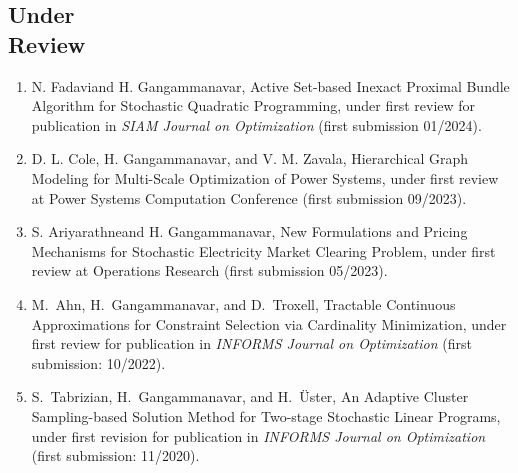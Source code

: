 \documentclass[hyperref, margin]{myResume}
\newif\ifpublic
\begin{document}
\begin{resume}
\section{Under\\Review}
\begin{enumerate}[label=R\arabic*., leftmargin=*] 
	\item N. Fadavi\footnotemark[1] and H. Gangammanavar, Active Set-based Inexact Proximal Bundle Algorithm for Stochastic Quadratic Programming, \ifpublic 2024 (first review). \else under first review for publication in \textit{SIAM Journal on Optimization} (first submission 01/2024)\fi.
	\item D. L. Cole, H. Gangammanavar, and V. M. Zavala, Hierarchical Graph Modeling for Multi-Scale Optimization of Power Systems, \ifpublic 2023 (first review). \else under first review at Power Systems Computation Conference (first submission 09/2023).\fi
	\item S. Ariyarathne\footnotemark[1] and H. Gangammanavar, New Formulations and Pricing Mechanisms for Stochastic Electricity Market Clearing Problem, \ifpublic 2023 (first revision). \else under first review at Operations Research (first submission 05/2023).\fi
	\item M.\ Ahn, H.\ Gangammanavar, and D.\ Troxell\footnotemark[3], Tractable Continuous Approximations for Constraint Selection via Cardinality Minimization, \ifpublic 2022 (first review). \else under first review for publication in \textit{INFORMS Journal on Optimization} (first submission: 10/2022).\fi
	\item S.\ Tabrizian\footnotemark[1], H.\ Gangammanavar, and H.\ \"{U}ster, An Adaptive Cluster Sampling-based Solution Method for Two-stage Stochastic Linear Programs, \ifpublic 2020. \else under first revision for publication in \textit{INFORMS Journal on Optimization} (first submission: 11/2020). \fi
\end{enumerate}


\end{resume}
\end{document}
